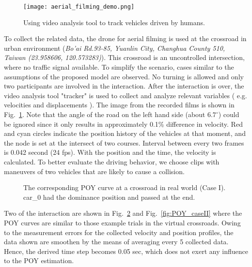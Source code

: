 \begin{figure}[htbp!]
\begin{center}
\texttt{[image: aerial\_filming\_demo.png]}
\end{center}
\caption{Using video analysis tool to track vehicles driven by humans.}
\label{aerial_filming} 
\end{figure}

To collect the related data, the drone for aerial filming is used at the crossroad in urban environment (\textit{Bo’ai Rd.93-85, Yuanlin City, Changhua County 510, Taiwan (23.958606, 120.573283)}). This crossroad is an uncontrolled intersection, where no traffic signal available. To simplify the scenario, cases similar to the assumptions of the proposed model are observed. No turning is allowed and only two participants are involved in the interaction. After the interaction is over, the video analysis tool "tracker" is used to collect and analyze relevant variables ( e.g. velocities and displacements ). The image from the recorded films is shown in Fig.~\ref{aerial_filming}. Note that the angle of the road on the left hand side (about $6.7^\circ$) could be ignored since it only results in approximately 0.1\% difference in velocity. Red and cyan circles indicate the position history of the vehicles at that moment, and the node is set at the intersect of two courses. Interval between every two frames is 0.042 second (24 fps). With the position and the time, the velocity is calculated. To better evaluate the driving behavior, we choose clips with maneuvers of two vehicles that are likely to cause a collision. 

\begin{figure}[htbp!]
\begin{center}
\end{center}
\caption{The corresponding POY curve at a crossroad in real world (Case I). car\_0 had the dominance position and passed at the end.}
\label{fig:POY_caseI} 
\end{figure}

Two of the interaction are shown in Fig.~\ref{fig:POY_caseI} and Fig.~\ref{fig:POY_caseII} where the POY curves are similar to those example trials in the virtual crossroads. Owing to the measurement errors for the collected velocity and position profiles, the data shown are smoothen by the means of averaging every 5 collected data. Hence, the derived time step becomes 0.05 sec, which does not exert any influence to the POY estimation.

